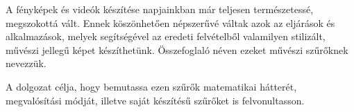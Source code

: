 

A fényképek és videók készítése napjainkban már teljesen természetessé, megszokottá vált. Ennek köszönhetően népszerűvé váltak azok az eljárások és alkalmazások, melyek segítségével az eredeti felvételből valamilyen stilizált, művészi jellegű képet készíthetünk. Összefoglaló néven ezeket művészi szűrőknek nevezzük.

A dolgozat célja, hogy bemutassa ezen szűrők matematikai hátterét, megvalósítási módját, illetve saját készítésű szűrőket is felvonultasson.






